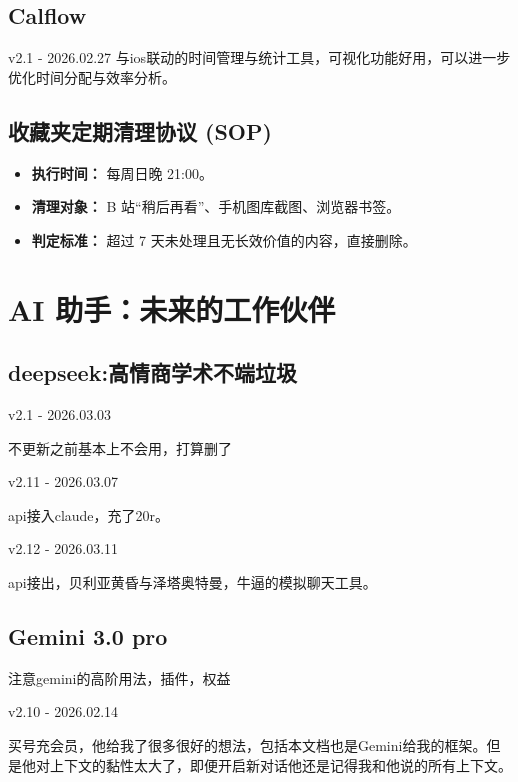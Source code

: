 \documentclass[11pt, a4paper, oneside]{book}
\begin{document}
\section{Calflow}

\begin{updatelog}{v2.1 - 2026.02.27}
    与ios联动的时间管理与统计工具，可视化功能好用，可以进一步优化时间分配与效率分析。
\end{updatelog}

\section{收藏夹定期清理协议 (SOP)}
\begin{itemize}
    \item \textbf{执行时间：} 每周日晚 21:00。
    \item \textbf{清理对象：} B 站“稍后再看”、手机图库截图、浏览器书签。
    \item \textbf{判定标准：} 超过 7 天未处理且无长效价值的内容，直接删除。
\end{itemize}

\chapter{AI 助手：未来的工作伙伴}

\section{deepseek:高情商学术不端垃圾}

\begin{updatelog}{v2.1 - 2026.03.03}
     
    不更新之前基本上不会用，打算删了

\end{updatelog}

\begin{updatelog}{v2.11 - 2026.03.07}
     
    api接入claude，充了20r。

\end{updatelog}

\begin{updatelog}{v2.12 - 2026.03.11}
     
    api接出，贝利亚黄昏与泽塔奥特曼，牛逼的模拟聊天工具。

\end{updatelog}

\section{Gemini 3.0 pro}
注意gemini的高阶用法，插件，权益
\begin{updatelog}{v2.10 - 2026.02.14}

    买号充会员，他给我了很多很好的想法，包括本文档也是Gemini给我的框架。但是他对上下文的黏性太大了，即便开启新对话他还是记得我和他说的所有上下文。

\end{updatelog}
\end{document}
